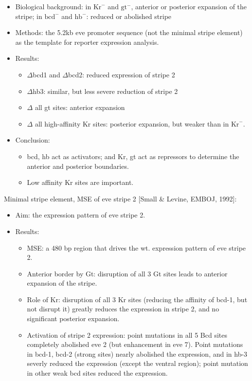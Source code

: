 \documentclass{report}
\begin{document}
\begin{enumerate}
\begin{itemize}
		\item Biological background: in $\text{Kr}^-$ and $\text{gt}^-$, anterior or posterior expansion of the stripe; in 
		$\text{bcd}^-$ and $\text{hb}^-$: reduced or abolished stripe
		
		\item Methods: the 5.2kb eve promoter sequence (not the minimal stripe element) as the template for reporter expression analysis. 
		
		\item Results:
		\begin{itemize}
			\item $\Delta$bcd1 and $\Delta$bcd2: reduced expression of stripe 2
			\item $\Delta$hb3: similar, but less severe reduction of stripe 2
			\item $\Delta$ all gt sites: anterior expansion
			\item $\Delta$ all high-affinity Kr sites: posterior expansion, but weaker than in $\text{Kr}^-$. 
		\end{itemize}
		
		\item Conclusion:
		\begin{itemize}
			\item bcd, hb act as activators; and Kr, gt act as repressors to determine the anterior and posterior boundaries. 
			\item Low affinity Kr sites are important. 
		\end{itemize}
	\end{itemize}
	
	Minimal stripe element, MSE of eve stripe 2 [Small \& Levine, EMBOJ, 1992]:
	\begin{itemize}
		\item Aim: the expression pattern of eve stripe 2. 
		
		\item Results: 
		\begin{itemize}
			\item MSE: a 480 bp region that drives the wt. expression pattern of eve stripe 2. 
			\item Anterior border by Gt: disruption of all 3 Gt sites leads to anterior expansion of the stripe. 
			\item Role of Kr: disruption of all 3 Kr sites (reducing the affinity of bcd-1, but not disrupt it) greatly reduces the expression in stripe 2, and no significant posterior expansion. 
			\item Activation of stripe 2 expression: point mutations in all 5 Bcd sites completely abolished eve 2 (but enhancement in eve 7). Point mutations in bcd-1, bcd-2 (strong sites) nearly abolished the expression, and in hb-3 severly reduced the expression (except the ventral region); point mutation in other weak bcd sites reduced the expression. 
		\end{itemize}
		

\end{itemize}
\end{enumerate}
\end{document}
